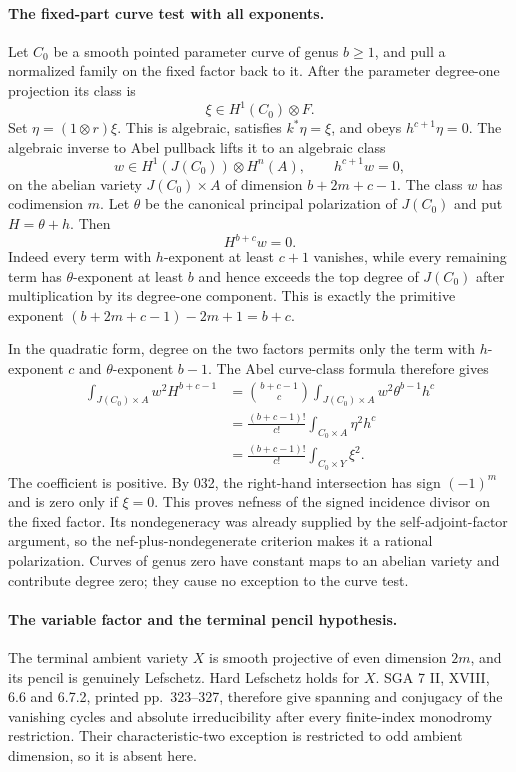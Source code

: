 \documentclass[11pt,a4paper]{article}
\begin{document}
\paragraph{The fixed-part curve test with all exponents.}
Let $C_0$ be a smooth pointed parameter curve of genus $b\ge1$, and
pull a normalized family on the fixed factor back to it. After the
parameter degree-one projection its class is
\[
 \xi\in H^1(C_0)\otimes F.
\]
Set $\eta=(1\otimes r)\xi$. This is algebraic, satisfies
$k^*\eta=\xi$, and obeys $h^{c+1}\eta=0$.
The algebraic inverse to Abel pullback lifts it to an algebraic class
\[
 w\in H^1(J(C_0))\otimes H^n(A),
       \qquad h^{c+1}w=0,
\]
on the abelian variety $J(C_0)\times A$ of dimension
$b+2m+c-1$. The class $w$ has codimension $m$.
Let $\theta$ be the canonical principal polarization of $J(C_0)$
and put $H=\theta+h$. Then
\[
 H^{b+c}w=0.
\]
Indeed every term with $h$-exponent at least $c+1$ vanishes, while
every remaining term has $\theta$-exponent at least $b$ and hence
exceeds the top degree of $J(C_0)$ after multiplication by its
degree-one component. This is exactly the primitive exponent
$(b+2m+c-1)-2m+1=b+c$.

In the quadratic form, degree on the two factors permits only the term
with $h$-exponent $c$ and $\theta$-exponent $b-1$. The Abel curve-class
formula therefore gives
\[
 \begin{aligned}
 \int_{J(C_0)\times A}w^2H^{b+c-1}
  &=\binom{b+c-1}{c}
       \int_{J(C_0)\times A}w^2\theta^{b-1}h^c\\
  &=\frac{(b+c-1)!}{c!}
       \int_{C_0\times A}\eta^2h^c\\
  &=\frac{(b+c-1)!}{c!}
       \int_{C_0\times Y}\xi^2.
 \end{aligned}
 \tag{H9.47}
\]
The coefficient is positive. By 032, the right-hand intersection has
sign $(-1)^m$ and is zero only if $\xi=0$. This proves nefness of the
signed incidence divisor on the fixed factor. Its nondegeneracy was
already supplied by the self-adjoint-factor argument, so the
nef-plus-nondegenerate criterion makes it a rational polarization.
Curves of genus zero have constant maps to an abelian variety and
contribute degree zero; they cause no exception to the curve test.

\paragraph{The variable factor and the terminal pencil hypothesis.}
The terminal ambient variety $X$ is smooth projective of even
dimension $2m$, and its pencil is genuinely Lefschetz. Hard Lefschetz
holds for $X$. SGA 7 II, XVIII, 6.6 and 6.7.2, printed pp.~323--327,
therefore give spanning and conjugacy of the vanishing cycles and
absolute irreducibility after every finite-index monodromy restriction.
Their characteristic-two exception is restricted to odd ambient
dimension, so it is absent here.
\end{document}
